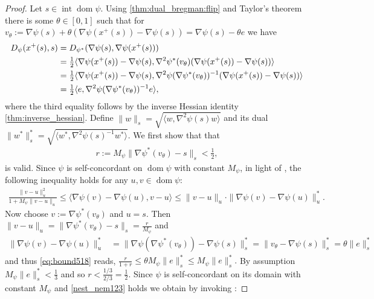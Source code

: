 \documentclass[11pt,onecolumn]{article}
\DeclareMathOperator{\dom}{dom}
\DeclareMathOperator{\intr}{int}
\theoremstyle{remark}
\begin{document}
\begin{proof}
Let $s\in \intr \dom \psi$. Using \cref{thm:dual_bregman:flip} and Taylor's theorem there is some $\theta \in [0,1]$ such that for 
$
v_\theta:=\nabla \psi(s) + \theta(\nabla \psi(x^{+}(s)) - \nabla \psi(s)) =\nabla \psi(s) - \theta e
$
we have
\begin{align} \label{eq:bregman_to_newton_decrement}
D_\psi(x^{+}(s), s) &= D_{\psi^*}(\nabla \psi(s),\nabla \psi(x^{+}(s))) \notag\\
&=\tfrac{1}{2}\langle \nabla \psi(x^+(s))- \nabla \psi(s), \nabla^2 \psi^*(v_\theta)(\nabla \psi(x^+(s))- \nabla \psi(s)) \rangle \notag\\
&=\tfrac{1}{2}\langle \nabla \psi(x^+(s))- \nabla \psi(s), \nabla^2 \psi(\nabla \psi^*(v_\theta))^{-1}(\nabla \psi(x^+(s))- \nabla \psi(s)) \rangle \notag\\
&=\tfrac{1}{2}\langle e, \nabla^2 \psi(\nabla \psi^*(v_\theta))^{-1} e \rangle,
\end{align}
where the third equality follows by the inverse Hessian identity \cref{thm:inverse_hessian}.
Define $\|w\|_{s}=\sqrt{\langle w, \nabla^2 \psi(s)w \rangle}$ and its dual $\|w^*\|_s^*=\sqrt{\langle w^*, \nabla^2 \psi(s)^{-1} w^* \rangle}$.
We first show that that
\begin{align} \label{nest_nem123}
r:=M_\psi \|\nabla \psi^*(v_\theta) - s\|_{s}  < \tfrac{1}{2},
\end{align}
is valid. Since $\psi$ is self-concordant on $\dom \psi$ with constant $M_\psi$, in light of \cite[Theorem 5.1.8]{nesterov2018lectures}, the following inequality holds for any $u,v \in \dom \psi$:
\begin{align} \label{eq:bound518}
 \frac{\|v-u\|_{u}^2}{1+M_\psi \|v-u\|_{u}} \leq \langle \nabla \psi(v)-\nabla \psi(u),v-u \rangle \leq \|v-u\|_u \cdot \|\nabla \psi(v)-\nabla \psi(u)\|_u^*.
\end{align}
Now choose $v:=\nabla \psi^*(v_\theta)$ and $u=s$. Then $\|v-u\|_{u}= \|\nabla \psi^*(v_\theta) - s\|_{s} = \frac{r}{M_\psi}$ and 
\begin{align}
\|\nabla \psi(v)-\nabla \psi(u)\|_u^* &=\|\nabla \psi(\nabla \psi^*(v_\theta))-\nabla \psi(s)\|_s^* =\|v_\theta -\nabla \psi(s)\|_s^* =\theta\|e\|_s^*
\end{align}
and thus \cref{eq:bound518} reads,
$
 \frac{r}{1 + r} \leq \theta M_\psi\|e\|_s^* \leq M_\psi\| e\|_s^*.
$
By assumption $M_\psi \| e\|_s^* < \frac{1}{3}$ and so $r < \frac{1/3}{2/3} = \tfrac{1}{2}$.
Since $\psi$ is self-concordant on its domain with constant $M_\psi$ and \cref{nest_nem123} holds we obtain by invoking \cite[Theorem 2.1.1(i)]{nesterov1994interior}:

\end{proof}
\end{document}
